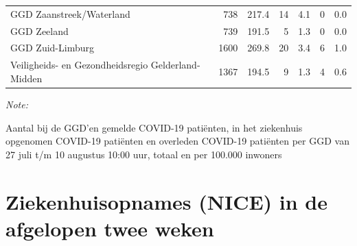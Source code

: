 \documentclass[
  english,
  man,floatsintext]{apa6}
\begin{document}
\begin{table}
\begin{threeparttable}
\begin{tabular}{lrrrrrr}
GGD Zaanstreek/Waterland & 738 & 217.4 & 14 & 4.1 & 0 & 0.0\\
GGD Zeeland & 739 & 191.5 & 5 & 1.3 & 0 & 0.0\\
GGD Zuid-Limburg & 1600 & 269.8 & 20 & 3.4 & 6 & 1.0\\
Veiligheids- en Gezondheidsregio Gelderland-Midden & 1367 & 194.5 & 9 & 1.3 & 4 & 0.6\\
\bottomrule
\end{tabular}
\begin{tablenotes}
\item \textit{Note: } 
\item Aantal bij de GGD’en gemelde COVID-19 patiënten, in het ziekenhuis opgenomen COVID-19 patiënten en overleden COVID-19 patiënten per GGD van 27 juli t/m 10 augustus 10:00 uur, totaal en per 100.000 inwoners
\end{tablenotes}
\end{threeparttable}
\endgroup{}
\end{table}

\newpage

\hypertarget{ziekenhuisopnames-nice-in-de-afgelopen-twee-weken}{%
\section{Ziekenhuisopnames (NICE) in de afgelopen twee weken}\label{ziekenhuisopnames-nice-in-de-afgelopen-twee-weken}}
\end{document}
